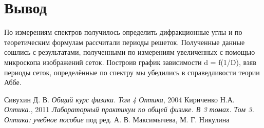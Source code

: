 \documentclass[12pt,a4paper]{article}
\begin{document}
\newpage

    \section*{Вывод}

    По измерениям спектров получилось определить дифракционные углы и по теоретическим формулам рассчитали периоды решеток. Полученные данные сошлись с результатами,  полученными по измерениям увеличенных с помощью микроскопа изображений сеток. Построив график зависимости d = f(1/D), взяв периоды сеток, определённые по спектру мы убедились в справедливости теории Аббе. 

\begin{thebibliography}{9}
	 Сивухин Д. В. \emph{Общий курс физики. Том 4 Оптика}, 2004
	 Кириченко Н.А. \emph{Оптика.}, 2011
	 \emph{Лабораторный практикум по общей физике. В 3 томах. Том 3. Оптика: учебное пособие} под ред. А. В. Максимычева, М. Г. Никулина
\end{thebibliography}
\end{document}
